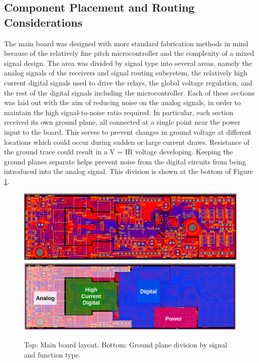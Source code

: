 	\subsection{Component Placement and Routing Considerations}

	The main board was designed with more standard fabrication methods in mind because of the relatively fine pitch microcontroller and the complexity of a mixed signal design. The area was divided by signal type into several areas, namely the analog signals of the receivers and signal routing subsystem, the relatively high current digital signals used to drive the relays, the global voltage regulation, and the rest of the digital signals including the microcontroller. Each of these sections was laid out with the aim of reducing noise on the analog signals, in order to maintain the high signal-to-noise ratio required. In particular, each section received its own ground plane, all connected at a single point near the power input to the board. This serves to prevent changes in ground voltage at different locations which could occur during sudden or large current draws. Resistance of the ground trace could result in a V = IR voltage developing. Keeping the ground planes separate helps prevent noise from the digital circuits from being introduced into the analog signal. This division is shown at the bottom of Figure \ref{fig:PCBdivisions}.

	\begin{figure}
		\centering
		\includegraphics[width = \textwidth]{PR5Images/MainBoard2D.png}
		\includegraphics[width = \textwidth]{PR5Images/PCBDivision.png}
		\caption{Top: Main board layout.  Bottom: Ground plane division by signal and function type.}
		\label{fig:PCBdivisions}
	\end{figure}

